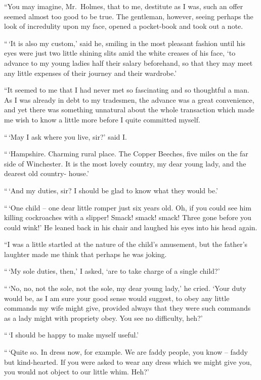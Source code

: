 “You may imagine, Mr.~Holmes, that to me, destitute as I
was, such an offer seemed almost too good to be true. The
gentleman, however, seeing perhaps the look of incredulity
upon my face, opened a pocket-book and took out a note.

“\,‘It is also my custom,’ said he, smiling in the most pleasant
fashion until his eyes were just two little shining slits
amid the white creases of his face, ‘to advance to my young
ladies half their salary beforehand, so that they may meet any
little expenses of their journey and their wardrobe.’

“It seemed to me that I had never met so fascinating and
so thoughtful a man. As I was already in debt to my tradesmen,
the advance was a great convenience, and yet there was
something unnatural about the whole transaction which made
me wish to know a little more before I quite committed myself.

“\,‘May I ask where you live, sir?’ said I.

“\,‘Hampshire. Charming rural place. The Copper Beeches,
five miles on the far side of Winchester. It is the most lovely
country, my dear young lady, and the dearest old country-%
house.’

“\,‘And my duties, sir? I should be glad to know what they
would be.’

“\,‘One child -- one dear little romper just six years old.
Oh, if you could see him killing cockroaches with a slipper!
Smack! smack! smack! Three gone before you could wink!’
He leaned back in his chair and laughed his eyes into his
head again.

“I was a little startled at the nature of the child’s amusement,
but the father’s laughter made me think that perhaps he
was joking.

“\,‘My sole duties, then,’ I asked, ‘are to take charge of a
single child?’

“\,‘No, no, not the sole, not the sole, my dear young lady,’
he cried. ‘Your duty would be, as I am sure your good sense
would suggest, to obey any little commands my wife might
give, provided always that they were such commands as a lady
might with propriety obey. You see no difficulty, heh?’

“\,‘I should be happy to make myself useful.’

“\,‘Quite so. In dress now, for example. We are faddy
people, you know -- faddy but kind-hearted. If you were asked
to wear any dress which we might give you, you would not
object to our little whim. Heh?’

